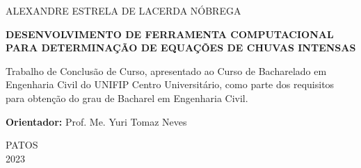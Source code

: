 \thispagestyle{empty}
	
	\begin{center}
		ALEXANDRE ESTRELA DE LACERDA NÓBREGA
	\end{center}
	
	\vspace{3.5cm}
	
	\begin{center}
		{\large \textbf{DESENVOLVIMENTO DE FERRAMENTA COMPUTACIONAL PARA DETERMINAÇÃO DE EQUAÇÕES DE CHUVAS INTENSAS}}
	\end{center}
	
	\vspace{4cm}
	
	\begin{quoting}[rightmargin=0cm,leftmargin=8cm]
 
        \noindent Trabalho de Conclusão de Curso, apresentado ao Curso de Bacharelado em Engenharia Civil do UNIFIP Centro Universitário, como parte dos requisitos para obtenção do grau de Bacharel em Engenharia Civil.
		
		\vspace{6pt}
		
		\noindent \textbf{Orientador:} Prof. Me. Yuri Tomaz Neves
		
		\vspace{6pt}
		

	\end{quoting}
	
	\vfill
	
	\begin{center}
		PATOS \\
			2023
	\end{center}
	\newpage
	